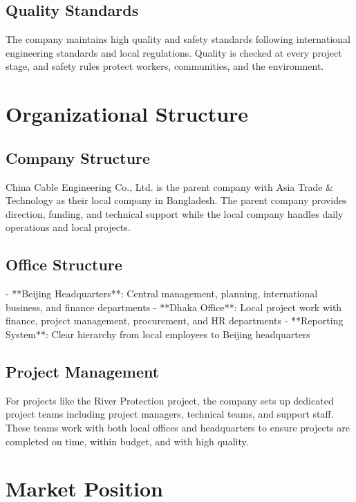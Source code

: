 \vspace{0.3em}
\subsection{Quality Standards}
The company maintains high quality and safety standards following international engineering standards and local regulations. Quality is checked at every project stage, and safety rules protect workers, communities, and the environment.

\vspace{0.5em}
\section{Organizational Structure}

\subsection{Company Structure}
China Cable Engineering Co., Ltd. is the parent company with Asia Trade \& Technology as their local company in Bangladesh. The parent company provides direction, funding, and technical support while the local company handles daily operations and local projects.

\subsection{Office Structure}
- **Beijing Headquarters**: Central management, planning, international business, and finance departments
- **Dhaka Office**: Local project work with finance, project management, procurement, and HR departments
- **Reporting System**: Clear hierarchy from local employees to Beijing headquarters

\subsection{Project Management}
For projects like the River Protection project, the company sets up dedicated project teams including project managers, technical teams, and support staff. These teams work with both local offices and headquarters to ensure projects are completed on time, within budget, and with high quality.

\vspace{0.5em}
\section{Market Position}

